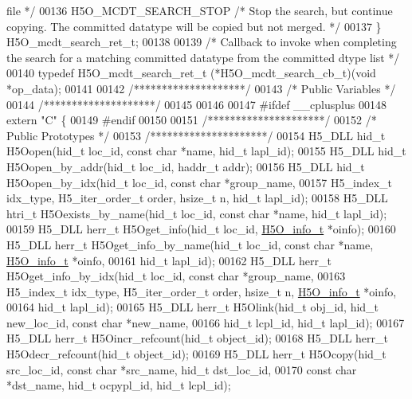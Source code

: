 \begin{DoxyCode}
{       file */}
00136     H5O\_MCDT\_SEARCH\_STOP    \textcolor{comment}{/* Stop the search, but continue copying.  The committed datatype will be
       copied but not merged. */}
00137 \} H5O\_mcdt\_search\_ret\_t;
00138 
00139 \textcolor{comment}{/* Callback to invoke when completing the search for a matching committed datatype from the committed dtype
       list */}
00140 \textcolor{keyword}{typedef} H5O\_mcdt\_search\_ret\_t (*H5O\_mcdt\_search\_cb\_t)(\textcolor{keywordtype}{void} *op\_data);
00141 
00142 \textcolor{comment}{/********************/}
00143 \textcolor{comment}{/* Public Variables */}
00144 \textcolor{comment}{/********************/}
00145 
00146 
00147 \textcolor{preprocessor}{#ifdef \_\_cplusplus}
00148 \textcolor{keyword}{extern} \textcolor{stringliteral}{"C"} \{
00149 \textcolor{preprocessor}{#endif}
00150 
00151 \textcolor{comment}{/*********************/}
00152 \textcolor{comment}{/* Public Prototypes */}
00153 \textcolor{comment}{/*********************/}
00154 H5\_DLL hid\_t H5Oopen(hid\_t loc\_id, \textcolor{keyword}{const} \textcolor{keywordtype}{char} *name, hid\_t lapl\_id);
00155 H5\_DLL hid\_t H5Oopen\_by\_addr(hid\_t loc\_id, haddr\_t addr);
00156 H5\_DLL hid\_t H5Oopen\_by\_idx(hid\_t loc\_id, \textcolor{keyword}{const} \textcolor{keywordtype}{char} *group\_name,
00157     H5\_index\_t idx\_type, H5\_iter\_order\_t order, hsize\_t n, hid\_t lapl\_id);
00158 H5\_DLL htri\_t H5Oexists\_by\_name(hid\_t loc\_id, \textcolor{keyword}{const} \textcolor{keywordtype}{char} *name, hid\_t lapl\_id);
00159 H5\_DLL herr\_t H5Oget\_info(hid\_t loc\_id, \hyperlink{struct_h5_o__info__t}{H5O\_info\_t} *oinfo);
00160 H5\_DLL herr\_t H5Oget\_info\_by\_name(hid\_t loc\_id, \textcolor{keyword}{const} \textcolor{keywordtype}{char} *name, \hyperlink{struct_h5_o__info__t}{H5O\_info\_t} *oinfo,
00161     hid\_t lapl\_id);
00162 H5\_DLL herr\_t H5Oget\_info\_by\_idx(hid\_t loc\_id, \textcolor{keyword}{const} \textcolor{keywordtype}{char} *group\_name,
00163     H5\_index\_t idx\_type, H5\_iter\_order\_t order, hsize\_t n, \hyperlink{struct_h5_o__info__t}{H5O\_info\_t} *oinfo,
00164     hid\_t lapl\_id);
00165 H5\_DLL herr\_t H5Olink(hid\_t obj\_id, hid\_t new\_loc\_id, \textcolor{keyword}{const} \textcolor{keywordtype}{char} *new\_name,
00166     hid\_t lcpl\_id, hid\_t lapl\_id);
00167 H5\_DLL herr\_t H5Oincr\_refcount(hid\_t object\_id);
00168 H5\_DLL herr\_t H5Odecr\_refcount(hid\_t object\_id);
00169 H5\_DLL herr\_t H5Ocopy(hid\_t src\_loc\_id, \textcolor{keyword}{const} \textcolor{keywordtype}{char} *src\_name, hid\_t dst\_loc\_id,
00170     \textcolor{keyword}{const} \textcolor{keywordtype}{char} *dst\_name, hid\_t ocpypl\_id, hid\_t lcpl\_id);

\end{DoxyCode}
